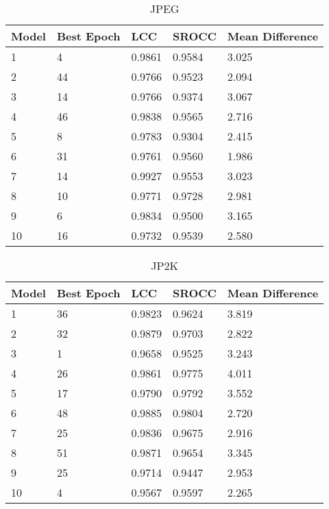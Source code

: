 \begin{table}[!ht]
\centering
\caption{JPEG}
\label{my-label}
\begin{tabular}{|l|l|l|l|l|}
\hline
Model & Best Epoch & LCC    & SROCC  & Mean Difference \\ \hline
1     & 4          & 0.9861 & 0.9584 & 3.025           \\ \hline
2     & 44         & 0.9766 & 0.9523 & 2.094           \\ \hline
3     & 14         & 0.9766 & 0.9374 & 3.067           \\ \hline
4     & 46         & 0.9838 & 0.9565 & 2.716           \\ \hline
5     & 8          & 0.9783 & 0.9304 & 2.415           \\ \hline
6     & 31         & 0.9761 & 0.9560 & 1.986           \\ \hline
7     & 14         & 0.9927 & 0.9553 & 3.023           \\ \hline
8     & 10         & 0.9771 & 0.9728 & 2.981           \\ \hline
9     & 6          & 0.9834 & 0.9500 & 3.165           \\ \hline
10    & 16         & 0.9732 & 0.9539 & 2.580           \\ \hline
\end{tabular}
\end{table}

\begin{table}[!ht]
\centering
\caption{JP2K}
\label{my-label}
\begin{tabular}{|l|l|l|l|l|}
\hline
Model & Best Epoch & LCC    & SROCC  & Mean Difference \\ \hline
1     & 36         & 0.9823 & 0.9624 & 3.819           \\ \hline
2     & 32         & 0.9879 & 0.9703 & 2.822           \\ \hline
3     & 1          & 0.9658 & 0.9525 & 3.243           \\ \hline
4     & 26         & 0.9861 & 0.9775 & 4.011           \\ \hline
5     & 17         & 0.9790 & 0.9792 & 3.552           \\ \hline
6     & 48         & 0.9885 & 0.9804 & 2.720           \\ \hline
7     & 25         & 0.9836 & 0.9675 & 2.916           \\ \hline
8     & 51         & 0.9871 & 0.9654 & 3.345           \\ \hline
9     & 25         & 0.9714 & 0.9447 & 2.953           \\ \hline
10    & 4          & 0.9567 & 0.9597 & 2.265           \\ \hline
\end{tabular}
\end{table}

